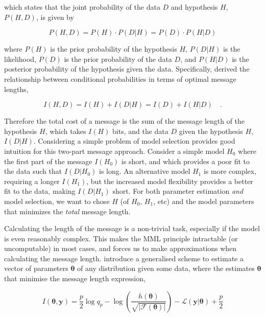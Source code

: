\documentclass{aastex61}
\newcommand{\vect}[1]{\boldsymbol{\mathbf{#1}}}
\def\vectheta{\vect{\theta}}
\def\datum{y}
\def\data{\vect{\datum}}
\def\likelihood{\mathcal{L}}
\begin{document}
\noindent{}which states that the joint probability of the data $D$ and 
hypothesis $H$, $P(H, D)$, is given by

\begin{equation}
  P(H, D) = P(H) \cdot P(D|H) = P(D) \cdot P(H|D)
\end{equation}

\noindent{}where $P(H)$ is the prior probability of the hypothesis $H$,
$P(D|H)$ is the likelihood, $P(D)$ is the prior probability of the data $D$,
and $P(H|D)$ is the posterior probability of the hypothesis given the data.
Specifically, \citet{Wallace_1968} derived the relationship between
conditional probabilities in terms of optimal message lengths,

\begin{equation}
  I(H, D) = I(H) + I(D|H) = I(D) + I(H|D) \quad .
  \label{eq:mml-wallace}
\end{equation}

Therefore the total cost of a message is the sum of the message length of the
hypothesis $H$, which takes $I(H)$ bits, and the data $D$ given the hypothesis
$H$, $I(D|H)$. 
Considering a simple problem of model selection provides good intuition for
this two-part message approach. 
Consider a simple model $H_0$ where the first part of the message $I(H_0)$ is 
short, and which provides a poor fit to the data such that $I(D|H_0)$ is long.
An alternative model $H_1$ is more complex, requiring a longer $I(H_1)$, but
the increased model flexibility provides a better fit to the data, making
$I(D|H_1)$ short.
For both parameter estimation \emph{and} model selection, we want to chose
$H$ (of $H_0$, $H_1$, etc) and the model parameters that minimizes the
\emph{total} message length.



Calculating the length of the message is a non-trivial task, especially if the
model is even reasonably complex.
This makes the MML principle intractable (or uncomputable) in most cases, and
forces us to make approximations when calculating the message length.
\citet{Wallace_Freeman_1987} introduce a generalised scheme to estimate a
vector of parameters $\vectheta$ of any distribution given some data, where
the estimates $\vectheta$ that minimise the message length expression,

\begin{equation}
  I(\vectheta,\data) 
    = \frac{p}{2}\log{q_p} - \log{\left(\frac{h(\vectheta)}{\sqrt{|\mathcal{F}(\vectheta)|}}\right)}
      - \likelihood\left(\data|\vectheta\right) + \frac{p}{2}
      \label{eq:message-length}
\end{equation}
\end{document}
